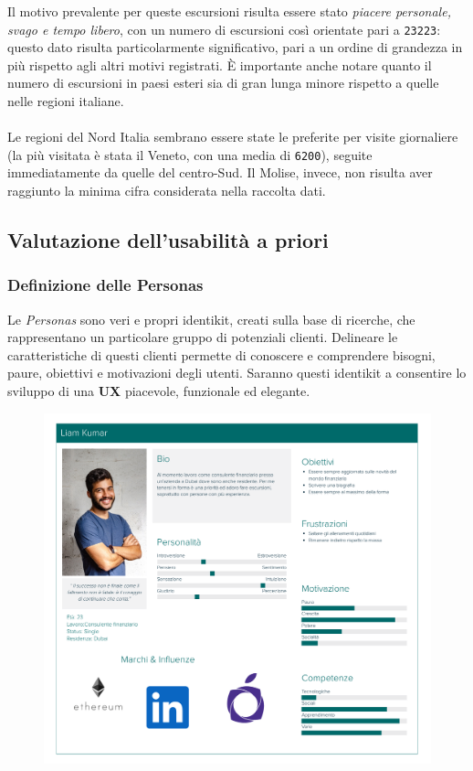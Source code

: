 \documentclass{natourDoc}
\begin{document}
Il motivo prevalente per queste escursioni risulta essere stato \textit{piacere personale, svago e tempo libero}, con un numero
di escursioni così orientate pari a \texttt{23223}: questo dato risulta particolarmente significativo, pari a un ordine
di grandezza in più rispetto agli altri motivi registrati. È importante anche notare quanto il numero di escursioni in paesi
esteri sia di gran lunga minore rispetto a quelle nelle regioni italiane.\\\\
Le regioni del Nord Italia sembrano essere state le preferite per visite giornaliere (la più visitata è stata il Veneto, con una media di
\texttt{6200}), seguite immediatamente da quelle del centro-Sud. Il Molise, invece, non risulta aver raggiunto
la minima cifra considerata nella raccolta dati.\\

\subsection{Valutazione dell'usabilità a priori}

\subsubsection{Definizione delle Personas}
Le \textit{Personas} sono veri e propri identikit, creati sulla base di ricerche, che rappresentano un particolare
gruppo di potenziali clienti. Delineare le caratteristiche di questi clienti permette di conoscere e comprendere
bisogni, paure, obiettivi e motivazioni degli utenti.
Saranno questi identikit a consentire lo sviluppo di una \textbf{UX} piacevole, funzionale ed elegante.

\begin{figure}[!htbp]
	\centering
	\includegraphics[width=\textwidth]{./personas/personas-kumar.pdf}
\end{figure}
\end{document}
